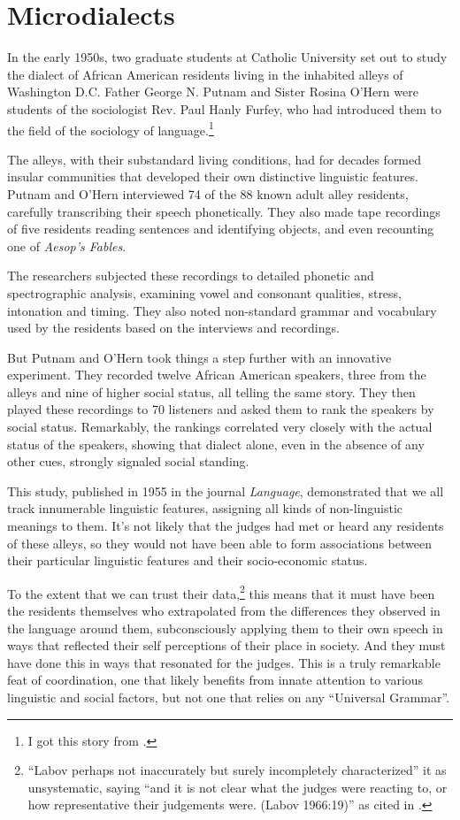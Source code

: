 \section{Microdialects}


In the early 1950s, two graduate students at Catholic University set out to study the dialect of African American residents living in the inhabited alleys of Washington D.C. Father George N. Putnam and Sister Rosina O'Hern were students of the sociologist Rev. Paul Hanly Furfey, who had introduced them to the field of the sociology of language.\footnote{I got this story from \citet[121--122]{Joseph2002}.}

The alleys, with their substandard living conditions, had for decades formed insular communities that developed their own distinctive linguistic features. Putnam and O'Hern interviewed 74 of the 88 known adult alley residents, carefully transcribing their speech phonetically. They also made tape recordings of five residents reading sentences and identifying objects, and even recounting one of \textit{Aesop's Fables}. 

The researchers subjected these recordings to detailed phonetic and spectrographic analysis, examining vowel and consonant qualities, stress, intonation and timing. They also noted non-standard grammar and vocabulary used by the residents based on the interviews and recordings.

But Putnam and O'Hern took things a step further with an innovative experiment. They recorded twelve African American speakers, three from the alleys and nine of higher social status, all telling the same story. They then played these recordings to 70 listeners and asked them to rank the speakers by social status. Remarkably, the rankings correlated very closely with the actual status of the speakers, showing that dialect alone, even in the absence of any other cues, strongly signaled social standing.

This study, published in 1955 in the journal \textit{Language}, demonstrated that we all track innumerable linguistic features, assigning all kinds of non-linguistic meanings to them. It's not likely that the judges had met or heard any residents of these alleys, so they would not have been able to form associations between their particular linguistic features and their socio-economic status. 

To the extent that we can trust their data,\footnote{``Labov perhaps not inaccurately but surely incompletely characterized'' it as unsystematic, saying ``and it is not clear what the judges were reacting to, or how representative their judgements were. (Labov 1966:19)'' as cited in \citet[125]{Joseph2002}.} this means that it must have been the residents themselves who extrapolated from the differences they observed in the language around them, subconsciously applying them to their own speech in ways that reflected their self perceptions of their place in society. And they must have done this in ways that resonated for the judges. This is a truly remarkable feat of coordination, one that likely benefits from innate attention to various linguistic and social factors, but not one that relies on any ``Universal Grammar''.